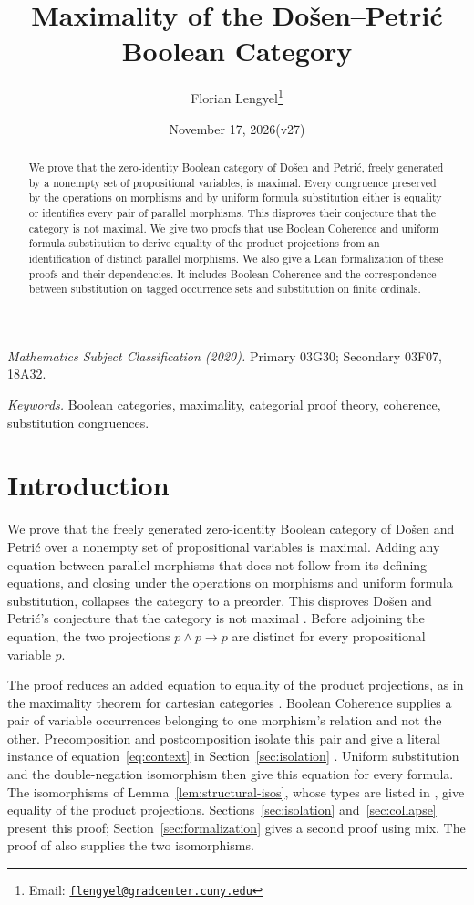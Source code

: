 \documentclass[11pt]{article}
\title{Maximality of the Do\v{s}en--Petri\'c Boolean Category}
\author{Florian Lengyel\thanks{Email: \href{mailto:flengyel@gradcenter.cuny.edu}{\texttt{flengyel@gradcenter.cuny.edu}}}}
\date{November 17, 2026\quad(v27)}
\begin{document}
\maketitle

\begin{abstract}
We prove that the zero-identity Boolean category of Do\v{s}en and
Petri\'c, freely generated by a nonempty set of propositional variables,
is maximal. Every congruence preserved by the operations on morphisms
and by uniform formula substitution either is equality or identifies
every pair of parallel morphisms. This disproves their conjecture that
the category is not maximal. We give two proofs that use Boolean
Coherence and uniform formula substitution to derive equality of the
product projections from an identification of distinct parallel
morphisms. We also give a Lean formalization of these proofs and their
dependencies. It includes Boolean Coherence and the correspondence
between substitution on tagged occurrence sets and substitution on
finite ordinals.
\end{abstract}

\medskip
\noindent\textit{Mathematics Subject Classification (2020).}
Primary 03G30; Secondary 03F07, 18A32.

\smallskip
\noindent\textit{Keywords.} Boolean categories, maximality, categorial proof theory,
coherence, substitution congruences.

\section{Introduction}

We prove that the freely generated zero-identity Boolean category of
Do\v{s}en and Petri\'c over a nonempty set of propositional variables
is maximal. Adding any equation between parallel morphisms that does
not follow from its defining equations, and closing under the operations on
morphisms and uniform formula substitution, collapses the category
to a preorder. This disproves Do\v{s}en and Petri\'c's conjecture that the category
is not maximal \cite[\S14.2, p.~322]{DP}. Before adjoining the equation, the
two projections $p\wedge p\to p$ are distinct for every
propositional variable $p$.

The proof reduces an added equation to equality of the product
projections, as in the maximality theorem for cartesian categories
\cite[\S5]{DPCartesian}. Boolean Coherence supplies a pair of
variable occurrences belonging to one morphism's relation and not the
other. Precomposition and postcomposition isolate this pair and
give a literal instance of equation~\eqref{eq:context} in
Section~\ref{sec:isolation} \cite[\S9.7, pp.~215--216]{DP}.
Uniform substitution and the double-negation isomorphism then give
this equation for every formula.
The isomorphisms of Lemma~\ref{lem:structural-isos}, whose types are
listed in \cite[\S12.5, p.~294]{DP}, give equality of the product
projections. Sections~\ref{sec:isolation}
and~\ref{sec:collapse} present this proof; Section~\ref{sec:formalization}
gives a second proof using mix. The proof of
\cite[Lemma~7]{DPIsomorphic} also supplies the two isomorphisms.
\end{document}
